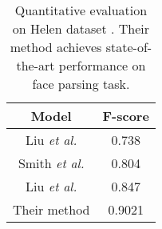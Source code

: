 \documentclass[10pt,twocolumn,letterpaper]{article}
\begin{document}
\begin{table}
	\caption{Quantitative evaluation on Helen dataset \cite{Le2012Interactive}. Their method achieves state-of-the-art performance on face parsing task.}\label{t1}
	\begin{center}
		\begin{tabular}{|c|c|}
			\hline
			Model & F-score \\
			\hline
			Liu \emph{et al.} \cite{Liu2011Nonparametric} & 0.738 \\
			Smith \emph{et al.} \cite{10.1109} & 0.804 \\
			Liu \emph{et al.} \cite{Liu2015Multi} & 0.847 \\
			Their method & 0.9021 \\
			\hline
		\end{tabular}
	\end{center}
\end{table}


{\small


}
\end{document}
